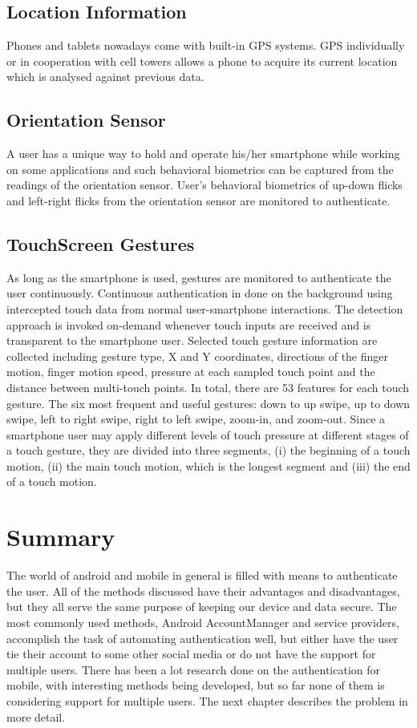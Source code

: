 \subsection{Location Information}
Phones and tablets nowadays come with built-in GPS systems. GPS individually or in cooperation with cell towers allows a phone to acquire its current location which is analysed against previous data.  \cite{takamizawa2012authentication}

\subsection{Orientation Sensor}
A user has a unique way to hold and operate his/her smartphone while working on some applications and such behavioral biometrics can be captured from the readings of the orientation sensor. User's behavioral biometrics of up-down flicks and left-right flicks from the orientation sensor are monitored to authenticate. \citep{lin2012new}

\subsection{TouchScreen Gestures}
As long as the smartphone is used, gestures are monitored to authenticate the user continuously.
Continuous authentication in done on the background using intercepted touch data from
normal user-smartphone interactions. The detection approach is invoked on-demand whenever touch inputs are received and is transparent to the smartphone user. Selected touch gesture information are collected including gesture type, X and Y coordinates, directions of the finger motion, finger motion speed, pressure at each sampled touch point and the distance between multi-touch points. In total, there are 53 features for each touch gesture. The six most frequent and useful gestures: down to up swipe, up to down swipe, left to right swipe, right to left swipe, zoom-in, and zoom-out. Since a smartphone user may apply different levels of touch pressure at different stages of a touch gesture, they are divided into three segments, (i) the
beginning of a touch motion, (ii) the main touch motion, which
is the longest segment and (iii) the end of a touch motion. \cite{feng2012continuous, li2013unobservable}

\section{Summary}
The world of android and mobile in general is filled with means to authenticate the user. All of the methods discussed have their advantages and disadvantages, but they all serve the same purpose of keeping our device and data secure. The most commonly used methods, Android AccountManager and service providers, accomplish the task of automating authentication well, but either have the user tie their account to some other social media or do not have the support for multiple users. There has been a lot research done on the authentication for mobile, with interesting methods being developed, but so far none of them is considering support for multiple users. The next chapter describes the problem in more detail.




